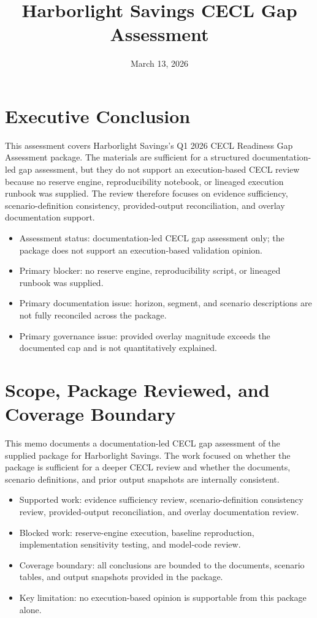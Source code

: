 \documentclass[11pt]{article}
\title{Harborlight Savings CECL Gap Assessment}
\date{March 13, 2026}
\begin{document}
\maketitle
\section*{Executive Conclusion}
This assessment covers Harborlight Savings's Q1 2026 CECL Readiness Gap Assessment package. The materials are sufficient for a structured documentation-led gap assessment, but they do not support an execution-based CECL review because no reserve engine, reproducibility notebook, or lineaged execution runbook was supplied. The review therefore focuses on evidence sufficiency, scenario-definition consistency, provided-output reconciliation, and overlay documentation support.
\begin{itemize}
\item Assessment status: documentation-led CECL gap assessment only; the package does not support an execution-based validation opinion.
\item Primary blocker: no reserve engine, reproducibility script, or lineaged runbook was supplied.
\item Primary documentation issue: horizon, segment, and scenario descriptions are not fully reconciled across the package.
\item Primary governance issue: provided overlay magnitude exceeds the documented cap and is not quantitatively explained.
\end{itemize}
\section*{Scope, Package Reviewed, and Coverage Boundary}
This memo documents a documentation-led CECL gap assessment of the supplied package for Harborlight Savings. The work focused on whether the package is sufficient for a deeper CECL review and whether the documents, scenario definitions, and prior output snapshots are internally consistent.
\begin{itemize}
\item Supported work: evidence sufficiency review, scenario-definition consistency review, provided-output reconciliation, and overlay documentation review.
\item Blocked work: reserve-engine execution, baseline reproduction, implementation sensitivity testing, and model-code review.
\item Coverage boundary: all conclusions are bounded to the documents, scenario tables, and output snapshots provided in the package.
\item Key limitation: no execution-based opinion is supportable from this package alone.
\end{itemize}
\end{document}
